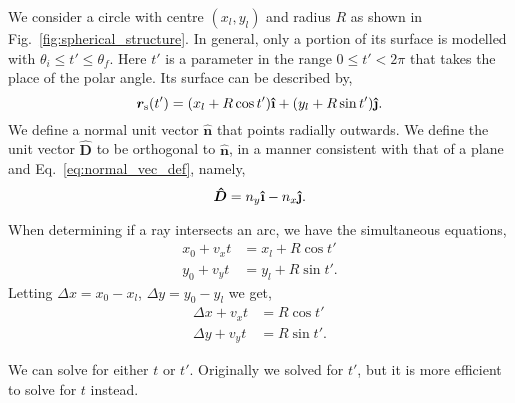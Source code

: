 \documentclass{article}
\let\vec \bm
\newcommand{\uveci}{{\bm{\hat{\textnormal{\bfseries\i}}}}}
\newcommand{\uvecj}{{\bm{\hat{\textnormal{\bfseries\j}}}}}
\begin{document}
We consider a circle with centre $(x_l, y_l)$ and radius $R$ as shown in Fig.~\ref{fig:spherical_structure}. In general, only a portion of its surface is modelled with $\theta_i \le t' \le \theta_f$. Here $t'$ is a parameter in the range $0 \le t' < 2\pi$ that takes the place of the polar angle. Its surface can be described by,
\begin{equation}
    \vec{r}_\mathrm{s}(t')
    =
    (x_l + R\cos t') \uveci
    +
    (y_l + R\sin t') \uvecj.
\end{equation}
We define a normal unit vector $\vec{\hat{n}}$ that points radially outwards. We define the unit vector $\vec{\hat{D}}$ to be orthogonal to $\vec{\hat{n}}$, in a manner consistent with that of a plane and Eq.~\ref{eq:normal_vec_def}, namely,
\begin{equation}
    \vec{\hat{D}}
    =
    n_y \uveci
    -
    n_x \uvecj.
\end{equation}

When determining if a ray intersects an arc, we have the simultaneous equations,
\begin{align}
    x_0 + v_x t &= x_l + R\cos t' \\
    y_0 + v_y t &= y_l + R\sin t'.
\end{align}
Letting $\Delta x = x_0 - x_l$, $\Delta y = y_0 - y_l$ we get,
\begin{align}
\label{eq:sph_simulataneous_1}
    \Delta x + v_x t &= R\cos t' \\
\label{eq:sph_simulataneous_2}
    \Delta y + v_y t &= R\sin t'.
\end{align}

We can solve for either $t$ or $t'$. Originally we solved for $t'$, but it is more efficient to solve for $t$ instead.
\end{document}
